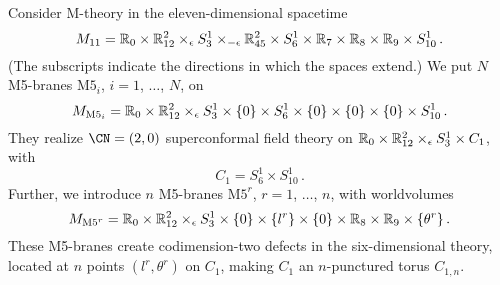 Consider M-theory in the eleven-dimensional spacetime
\begin{equation}
  M_{11}
  =
  \mathbb{R}_0 \times \mathbb{R}^2_{12} \times_\epsilon S^1_3 \times_{-\epsilon} \mathbb{R}^2_{45}
  \times S^1_6 \times \mathbb{R}_7 \times \mathbb{R}_8 \times \mathbb{R}_9 \times S^1_{10} \,.
\end{equation}
(The subscripts indicate the directions in which the spaces extend.)
We put $N$ M5-branes $\mathrm{M5}_i$, $i = 1$, $\dotsc$, $N$, on
\begin{equation}
  M_{\mathrm{M5}_i} =
  \mathbb{R}_0 \times \mathbb{R}^2_{12} \times_\epsilon S^1_3 \times \{0\}
  \times S^1_6 \times \{0\} \times \{0\} \times \{0\} \times S^1_{10} \,.
\end{equation}
They realize $\CN = (2,0)$ superconformal field theory on
$\mathbb{R}_0 \times \mathbb{R}^2_{12} \times_\epsilon S^1_3 \times C_1$, with
\begin{equation}
  C_1 = S^1_6 \times S^1_{10} \,.
\end{equation}
Further, we introduce $n$ M5-branes $\mathrm{M5}^r$, $r = 1$,
$\dotsc$, $n$, with worldvolumes
\begin{equation}
  M_{\mathrm{M5}^r} =
  \mathbb{R}_0 \times \mathbb{R}^2_{12} \times_\epsilon S^1_3 \times \{0\}
  \times \{l^r\} \times \{0\} \times \mathbb{R}_8 \times \mathbb{R}_9 \times \{\theta^r\} \,.
\end{equation}
These M5-branes create codimension-two defects in the six-dimensional
theory, located at $n$ points $(l^r,\theta^r)$ on $C_1$, making $C_1$
an $n$-punctured torus $C_{1,n}$.

